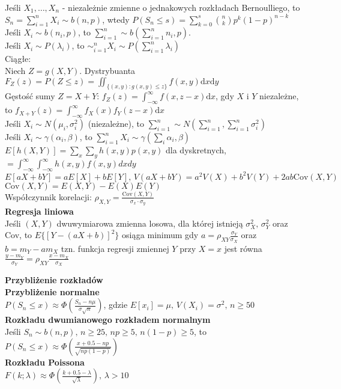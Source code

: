 \documentclass[10pt,landscape,a4paper,notitlepage]{article}
\begin{document}
\begin{multicols*}{4}
        Jeśli $X_1,\ldots,X_n$ - niezależnie zmienne o jednakowych rozkładach Bernoulliego, to $S_n=\sum_{i=1}^nX_i\sim b(n,p)$, wtedy $P(S_n\leq s)=\sum_{k=0}^s\binom{n}{k}p^k(1-p)^{n-k}$\\
        Jeśli $X_i\sim b(n_i,p)$, to $\sum_{i=1}^n\sim b(\sum_{i=1}^nn_i,p)$.\\
        Jeśli $X_i\sim P(\lambda_i)$, to $\sim_{i=1}^nX_i\sim P(\sum_{i=1}^n\lambda_i)$\\
        Ciągłe:\\
        Niech $Z=g(X,Y)$. Dystrybuanta $F_Z(z)=P(Z\leq z)=\iint_{\{(x,y):g(x,y)\leq z\}}f(x,y)\mathrm{d}x\mathrm{d}y$\\
        Gęstość sumy $Z=X+Y:\,f_Z(z)=\int_{-\infty}^{\infty}f(x,z-x)\mathrm{d}x$, 
        gdy $X$ i $Y$ niezależne, to $f_{X+Y}(z)=\int_{-\infty}^{\infty}f_X(x)f_Y(z-x)\mathrm{d}x$\\
        Jeśli $X_i\sim N(\mu_i,\sigma_i^2)$ (niezależne), to $\sum_{i=1}^n\sim N(\sum_{i=1}^n,\sum_{i=1}^n\sigma_i^2)$\\
        Jeśli $X_i\sim \gamma(\alpha_i,\beta)$, to $\sum_{i=1}^nX_i\sim \gamma(\sum_i\alpha_i,\beta)$\\
        $E[h(X,Y)]=\sum_x\sum_yh(x,y)p(x,y)$ dla dyskretnych, $=\int_{-\infty}^{\infty}\int_{-\infty}^{\infty}h(x,y)f(x,y)dxdy$\\
        $E[aX+bY]=aE[X]+bE[Y],\,V(aX+bY)=a^2V(X)+b^2V(Y)+2ab\mathrm{Cov}(X,Y)$\\
        $\mathrm{Cov}(X,Y)=E(X,Y)-E(X)E(Y)$\\
        Współczynnik korelacji: $\rho_{X,Y}=\frac{\mathrm{Cov}(X,Y)}{\sigma_x\cdot\sigma_y}$\\
        \textbf{Regresja liniowa}\\
        Jeśli $(X,Y)$ dwuwymiarowa zmienna losowa, dla której istnieją $\sigma_X^2,\,\sigma_Y^2$ oraz Cov, to $E\{[Y-(aX+b)]^2\}$ osiąga minimum gdy $a=\rho_{XY}\frac{\sigma_Y}{\sigma_X}$ oraz $b=m_Y-am_X$
        tzn. funkcja regresji zmiennej $Y$ przy $X=x$ jest równa $\frac{y-m_Y}{\sigma_Y}=\rho_{XY}\frac{x-m_X}{\sigma_X}$

        \noindent\textbf{\large Przybliżenie rozkładów}\\
        \textbf{Przybliżenie normalne}\\
        $P(S_n\leq x)\approx \Phi(\frac{S_n-n\mu}{\sigma\sqrt{n}})$, gdzie $E[x_i]=\mu,\,V(X_i)=\sigma^2,\,n\geq 50$\\
        \textbf{Rozkładu dwumianowego rozkładem normalnym}\\
        Jeśli $S_n\sim b(n,p),\,n\geq 25,\, np\geq 5,\, n(1-p)\geq 5$, to $P(S_n\leq x)\approx\Phi\left(\frac{x+0.5-np}{\sqrt{np(1-p)}}\right)$\\
        \textbf{Rozkładu Poissona}\\
        $F(k;\lambda)\approx \Phi\left(\frac{k+0.5-\lambda}{\sqrt{\lambda}}\right),\,\lambda>10$


\end{multicols*}
\end{document}
